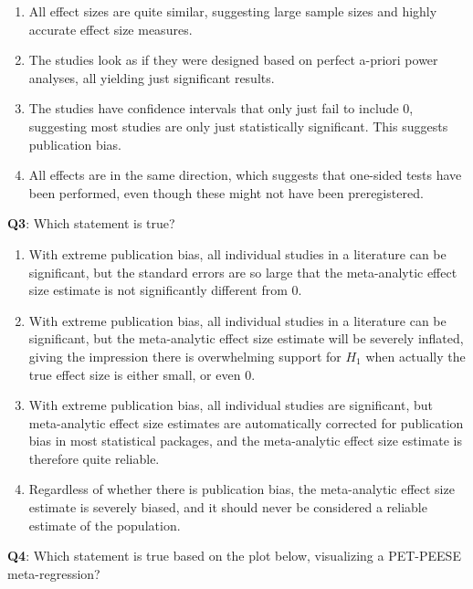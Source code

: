 \documentclass[
  oneside]{krantz}
\providecommand{\tightlist}{%
  \setlength{\itemsep}{0pt}\setlength{\parskip}{0pt}}
\begin{document}
\begin{enumerate}
\def\labelenumi{\Alph{enumi})}
\tightlist
\item
  All effect sizes are quite similar, suggesting large sample sizes and highly accurate effect size measures.
\item
  The studies look as if they were designed based on perfect a-priori power analyses, all yielding just significant results.
\item
  The studies have confidence intervals that only just fail to include 0, suggesting most studies are only just statistically significant. This suggests publication bias.
\item
  All effects are in the same direction, which suggests that one-sided tests have been performed, even though these might not have been preregistered.
\end{enumerate}

\textbf{Q3}: Which statement is true?

\begin{enumerate}
\def\labelenumi{\Alph{enumi})}
\tightlist
\item
  With extreme publication bias, all individual studies in a literature can be significant, but the standard errors are so large that the meta-analytic effect size estimate is not significantly different from 0.
\item
  With extreme publication bias, all individual studies in a literature can be significant, but the meta-analytic effect size estimate will be severely inflated, giving the impression there is overwhelming support for \(H_1\) when actually the true effect size is either small, or even 0.
\item
  With extreme publication bias, all individual studies are significant, but
  meta-analytic effect size estimates are automatically corrected for publication bias in most statistical packages, and the meta-analytic effect size estimate is therefore quite reliable.
\item
  Regardless of whether there is publication bias, the meta-analytic effect size estimate is severely biased, and it should never be considered a reliable estimate of the population.
\end{enumerate}

\textbf{Q4}: Which statement is true based on the plot below, visualizing a PET-PEESE meta-regression?
\end{document}

